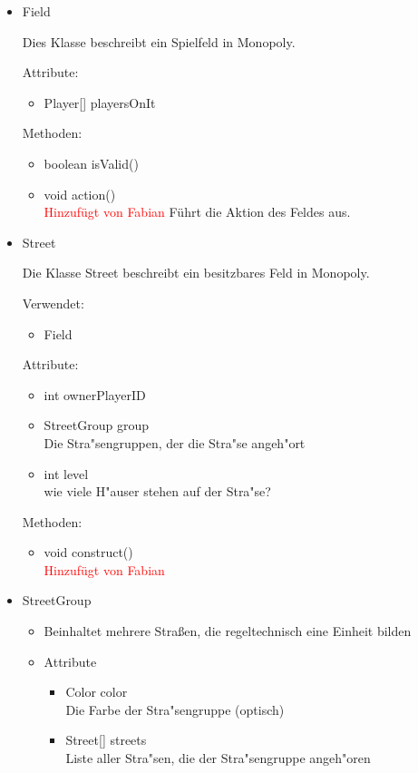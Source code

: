 \documentclass[a4paper,10pt]{article}
\begin{document}
\begin{itemize}
\item Field
\begin{itemize}
Dies Klasse beschreibt ein Spielfeld in Monopoly.

Attribute:
\begin{itemize}
\item Player[] playersOnIt
\end{itemize}

Methoden:
\begin{itemize}
\item boolean isValid()
\item void action()
\\ \textcolor{red}{Hinzufügt von Fabian} Führt die Aktion des Feldes aus.
\end{itemize}
\end{itemize}

\item Street
\begin{itemize}
Die Klasse Street beschreibt ein besitzbares Feld in Monopoly.

Verwendet:
\begin{itemize}
\item Field
\end{itemize}

Attribute:
\begin{itemize}
\item int ownerPlayerID
\item StreetGroup group
\\Die Stra"sengruppen, der die Stra"se angeh"ort
\item int level
\\wie viele H"auser stehen auf der Stra"se?
\end{itemize}

Methoden:
\begin{itemize}
\item void construct()
\\ \textcolor{red}{Hinzufügt von Fabian}
\end{itemize}
\end{itemize}

\item StreetGroup
\begin{itemize}
\item Beinhaltet mehrere Straßen, die regeltechnisch eine Einheit bilden
\item Attribute
\begin{itemize}
\item Color color
\\Die Farbe der Stra"sengruppe (optisch)
\item Street[] streets
\\Liste aller Stra"sen, die der Stra"sengruppe angeh"oren
\end{itemize}
\end{itemize}


\end{itemize}
\end{document}
